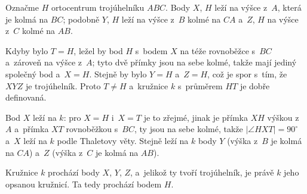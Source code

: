{    Označme $H$ ortocentrum trojúhelníku $ABC$. Body $X$, $H$ leží na výšce z~$A$, která je kolmá na $BC$; podobně $Y$, $H$ leží na výšce z~$B$ kolmé na $CA$ a~$Z$, $H$ na výšce z~$C$ kolmé na $AB$.

    Kdyby bylo $T = H$, ležel by bod $H$ s~bodem $X$ na téže rovnoběžce s~$BC$ a~zároveň na výšce z~$A$; tyto dvě přímky jsou na sebe kolmé, takže mají jediný společný bod a~$X = H$. Stejně by bylo $Y = H$ a~$Z = H$, což je spor s~tím, že $XYZ$ je trojúhelník. Proto $T \neq H$ a~kružnice $k$ s~průměrem $HT$ je dobře definovaná.

    Bod $X$ leží na $k$: pro $X = H$ i~$X = T$ je to zřejmé, jinak je přímka $XH$ výškou z~$A$ a~přímka $XT$ rovnoběžkou s~$BC$, ty jsou na sebe kolmé, takže $|\angle HXT| = 90^\circ$ a~$X$ leží na $k$ podle Thaletovy věty. Stejně leží na $k$ body $Y$ (výška z~$B$ je kolmá na $CA$) a~$Z$ (výška z~$C$ je kolmá na $AB$).

    Kružnice $k$ prochází body $X$, $Y$, $Z$, a~jelikož ty tvoří trojúhelník, je právě $k$ jeho opsanou kružnicí. Ta tedy prochází bodem $H$.
}


